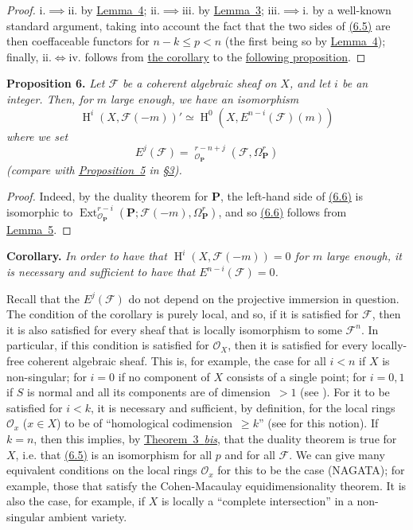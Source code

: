 \documentclass{article}
\newenvironment{itenv}[1]
  {\phantomsection\par\medskip\noindent\textbf{#1.}\itshape}
  {\par\medskip}
\newcommand{\scr}[1]{{\mathscr{#1}}}
\newcommand{\bb}{\mathbf}
\renewcommand{\geq}{\geqslant}
\renewcommand{\leq}{\leqslant}
\DeclareMathOperator{\Ext}{Ext}
\DeclareMathOperator{\shExt}{\underline{Ext}}
\DeclareMathOperator{\HH}{H}
\newcommand{\oldpage}[1]{\marginpar{\footnotesize$\Big\vert$ \textit{p.~#1}}}
\begin{document}
\begin{proof}
  i.$\implies$ii. by \hyperref[lemma4]{Lemma~4};
  ii.$\implies$iii. by \hyperref[lemma3]{Lemma~3};
  iii.$\implies$i. by a well-known standard argument, taking into account the fact that the two sides of \hyperref[6.5]{(6.5)} are then coeffaceable functors for $n-k\leq p< n$ (the first being so by \hyperref[lemma4]{Lemma~4});
  finally, ii.$\iff$iv. follows from \hyperref[proposition6corollary]{the corollary} to the \hyperref[proposition6]{following proposition}.
\end{proof}

\begin{itenv}{Proposition 6}
\label{proposition6}
  Let $\scr{F}$ be a coherent algebraic sheaf on $X$, and let $i$ be an integer.
  Then, for $m$ large enough, we have an isomorphism
  \[
  \label{6.6}
    \HH^i(X,\scr{F}(-m))' \simeq \HH^0(X,E^{n-i}(\scr{F})(m))
  \tag{6.6}
  \]
  where we set
  \[
  \label{6.7}
    E^j(\scr{F}) = \shExt_{\scr{O}_\bb{P}}^{r-n+j}(\scr{F},\Omega_\bb{P}^r)
  \tag{6.7}
  \]
  (compare with \hyperref[proposition5]{Proposition~5} in \hyperref[section3]{\S3}).
\end{itenv}

\begin{proof}
  Indeed, by the duality theorem for $\bb{P}$, the left-hand side of \hyperref[6.6]{(6.6)} is isomorphic to $\Ext_{\scr{O}_\bb{P}}^{r-i}(\bb{P};\scr{F}(-m),\Omega_\bb{P}^r)$, and so \hyperref[6.6]{(6.6)} follows from \hyperref[lemma5]{Lemma~5}.
\end{proof}

\oldpage{149-19}
\begin{itenv}{Corollary}
\label{proposition6corollary}
  In order to have that $\HH^i(X,\scr{F}(-m))=0$ for $m$ large enough, it is necessary and sufficient to have that $E^{n-i}(\scr{F})=0$.
\end{itenv}

Recall that the $E^j(\scr{F})$ do not depend on the projective immersion in question.
The condition of the corollary is purely local, and so, if it is satisfied for $\scr{F}$, then it is also satisfied for every sheaf that is locally isomorphism to some $\scr{F}^n$.
In particular, if this condition is satisfied for $\scr{O}_X$, then it is satisfied for every locally-free coherent algebraic sheaf.
This is, for example, the case for all $i<n$ if $X$ is non-singular; for $i=0$ if no component of $X$ consists of a single point; for $i=0,1$ if $S$ is normal and all its components are of dimension~$>1$ (see \cite{3}).
For it to be satisfied for $i<k$, it is necessary and sufficient, by definition, for the local rings $\scr{O}_x$ ($x\in X$) to be of ``homological codimension~$\geq k$'' (see \cite{4} for this notion).
If $k=n$, then this implies, by \hyperref[theorem3bis]{Theorem~3~\emph{bis}}, that the duality theorem is true for $X$, i.e. that \hyperref[6.5]{(6.5)} is an isomorphism for all $p$ and for all $\scr{F}$.
We can give many equivalent conditions on the local rings $\scr{O}_x$ for this to be the case (NAGATA);
for example, those that satisfy the Cohen-Macaulay equidimensionality theorem.
It is also the case, for example, if $X$ is locally a ``complete intersection'' in a non-singular ambient variety.
\end{document}
